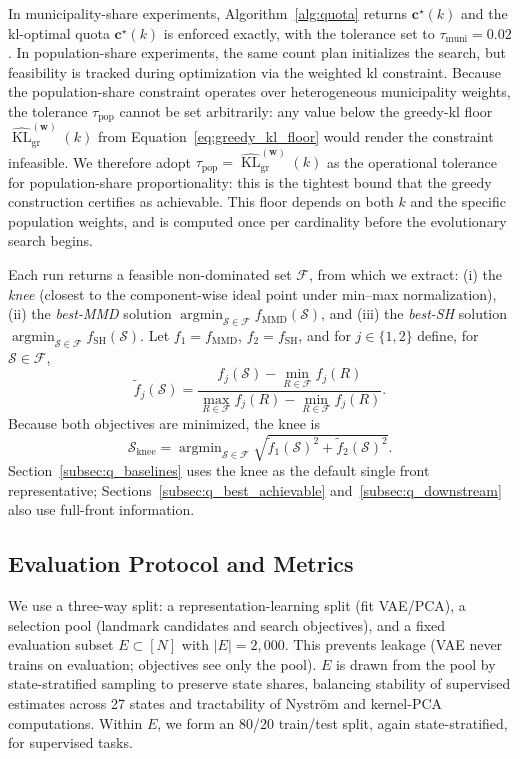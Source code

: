 \documentclass[10pt,journal]{IEEEtran}
\newcommand{\1}{\mathbf{1}}
\newcommand{\bw}{\mathbf{w}}
\newcommand{\bc}{\mathbf{c}}
\newcommand{\Sel}{\mathcal{S}}
\DeclareMathOperator{\KL}{KL}
\DeclareMathOperator*{\argmin}{argmin}
\theoremstyle{ieeethm}
\begin{document}
In municipality-share experiments, Algorithm~\ref{alg:quota} returns $\bc^\star(k)$ and the \gls{kl}-optimal quota $\bc^\star(k)$ is enforced exactly, with the tolerance set to $\tau_{\mathrm{muni}}=0.02$. In population-share experiments, the same count plan initializes the search, but feasibility is tracked during optimization via the weighted \gls{kl} constraint. Because the population-share constraint operates over heterogeneous municipality weights, the tolerance $\tau_{\mathrm{pop}}$ cannot be set arbitrarily: any value below the greedy-\gls{kl} floor $\widehat{\KL}^{(\bw)}_{\mathrm{gr}}(k)$ from Equation~\eqref{eq:greedy_kl_floor} would render the constraint infeasible. We therefore adopt $\tau_{\mathrm{pop}}=\widehat{\KL}^{(\bw)}_{\mathrm{gr}}(k)$ as the operational tolerance for population-share proportionality: this is the tightest bound that the greedy construction certifies as achievable. This floor depends on both $k$ and the specific population weights, and is computed once per cardinality before the evolutionary search begins.

Each run returns a feasible non-dominated set $\mathcal F$, from which we extract: (i) the \emph{knee} (closest to the component-wise ideal point under min--max normalization), (ii) the \emph{best-MMD} solution $\argmin_{\Sel\in\mathcal F} f_{\mathrm{MMD}}(\Sel)$, and (iii) the \emph{best-SH} solution $\argmin_{\Sel\in\mathcal F} f_{\mathrm{SH}}(\Sel)$. Let $f_1=f_{\mathrm{MMD}}$, $f_2=f_{\mathrm{SH}}$, and for $j\in\{1,2\}$ define, for $\Sel\in\mathcal F$,
\begin{equation*}
\widetilde f_j(\Sel)
=
\frac{f_j(\Sel)-\min_{R\in\mathcal F}f_j(R)}
{\max_{R\in\mathcal F}f_j(R)-\min_{R\in\mathcal F}f_j(R)}.
\end{equation*}
Because both objectives are minimized, the knee is
\begin{equation*}
\Sel_{\mathrm{knee}}
=
\argmin_{\Sel\in\mathcal F}
\sqrt{\widetilde f_1(\Sel)^2+\widetilde f_2(\Sel)^2}.
\end{equation*}
Section~\ref{subsec:q_baselines} uses the knee as the default single front representative; Sections~\ref{subsec:q_best_achievable} and~\ref{subsec:q_downstream} also use full-front information.

\subsection{Evaluation Protocol and Metrics}
\label{subsec:eval_protocol}

We use a three-way split: a representation-learning split (fit VAE/PCA), a selection pool (landmark candidates and search objectives), and a fixed evaluation subset $E\subset[N]$ with $|E|=2{,}000$. This prevents leakage (VAE never trains on evaluation; objectives see only the pool). $E$ is drawn from the pool by state-stratified sampling to preserve state shares, balancing stability of supervised estimates across 27 states and tractability of Nyström and kernel-PCA computations. Within $E$, we form an 80/20 train/test split, again state-stratified, for supervised tasks.
\end{document}
